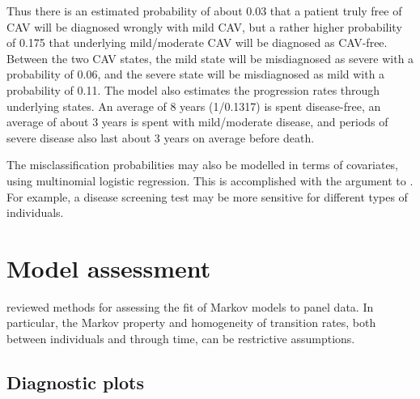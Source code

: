 \documentclass[article,shortnames]{jss}
\begin{document}
Thus there is an estimated probability of about 0.03 that a patient
truly free of CAV will be diagnosed wrongly with mild CAV, but a
rather higher probability of 0.175 that underlying mild/moderate CAV
will be diagnosed as CAV-free.  Between the two CAV states, the mild
state will be misdiagnosed as severe with a probability of 0.06, and
the severe state will be misdiagnosed as mild with a probability of
0.11.  The model also estimates the progression rates through
underlying states.  An average of 8 years (1/0.1317) is spent
disease-free, an average of about 3 years is spent with mild/moderate
disease, and periods of severe disease also last about 3 years on
average before death.

The misclassification probabilities may also be modelled in terms of
covariates, using multinomial logistic regression.  This is
accomplished with the  argument to .
For example, a disease screening test may be more sensitive for
different types of individuals.


\section{Model assessment}
\label{sec:assessment}

\citet{titman:review:jss} reviewed methods for assessing the fit of Markov
models to panel data. In particular, the Markov property and
homogeneity of transition rates, both between individuals and through
time, can be restrictive assumptions.


\subsection{Diagnostic plots}
\end{document}
